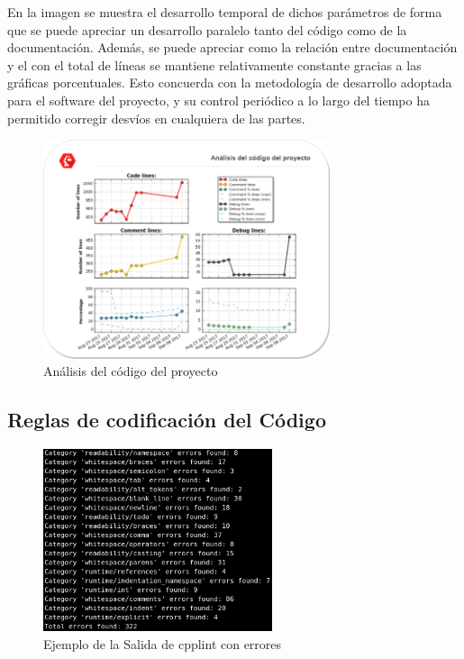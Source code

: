    En la imagen se muestra el desarrollo temporal de dichos parámetros de forma que se puede apreciar un desarrollo paralelo tanto del código como de la documentación. Además, se puede apreciar como la relación entre documentación y el  con el total de líneas se mantiene relativamente constante gracias a las gráficas porcentuales. Esto concuerda con la metodología de desarrollo adoptada para el software del proyecto, y su control periódico a lo largo del tiempo ha permitido corregir desvíos en cualquiera de las partes.
    
    \begin{figure}[H]
        \centering
        \includegraphics[width=0.75\textwidth]{figuras/Imagenes_SW/analisis_codigo.png}   
        \caption{Análisis del código del proyecto}
        \label{fig:SW:code_analysis}
    \end{figure}
    
    \subsection{Reglas de codificación del Código}
    
    \begin{figure}[H]
    	\centering
    	\includegraphics[width=0.60\textwidth]{figuras/Imagenes_SW/test/codificacion_1.png}   
    	\caption{Ejemplo de la Salida de cpplint con errores}
    	\label{fig:SW:test:codif_output}
    \end{figure}
    
